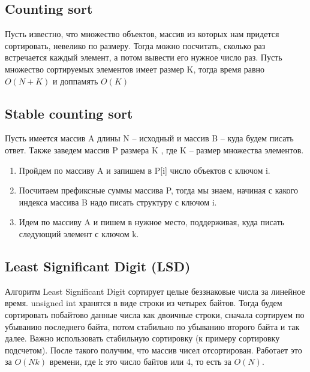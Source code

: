 \subsection*{Counting sort}

Пусть известно, что множество объектов, массив из которых нам придется сортировать, невелико по размеру.
Тогда можно посчитать, сколько раз встречается каждый элемент, а потом вывести его нужное число раз.
Пусть множество сортируемых элементов имеет размер K, тогда время равно $O(N + K)$ и доппамять $O(K)$

\subsection*{Stable counting sort}

Пусть имеется массив A длины N -- исходный и массив B -- куда будем писать ответ. Также заведем массив P размера K , где K -- размер множества элементов.

\begin{enumerate}
    \item Пройдем по массиву A и запишем в P[i] число объектов с ключом i.
    \item Посчитаем префиксные суммы массива P, тогда мы знаем, начиная с какого индекса массива B надо писать структуру с ключом i.
    \item Идем по массиву A и пишем в нужное место, поддерживая, куда писать следующий элемент с ключом k.
\end{enumerate}

\subsection*{Least Significant Digit (LSD)}

Алгоритм Least Significant Digit сортирует целые беззнаковые числа за
линейное время.
unsigned int хранятся в виде строки из четырех байтов.
Тогда будем сортировать побайтово данные числа как
двоичные строки, сначала сортируем по убыванию последнего байта,
потом стабильно по убыванию второго байта и так далее. Важно использовать стабильную сортировку (к примеру сортировку подсчетом). После такого
получим, что массив чисел отсортирован.
Работает это за $O(Nk)$ времени, где k это число байтов или 4, то есть
за $O(N)$.

\pagebreak